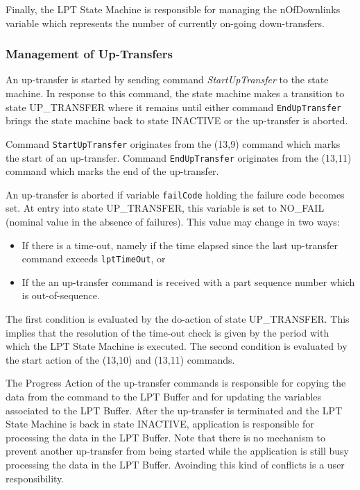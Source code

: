 \documentclass{pnp_article}
\begin{document}
Finally, the LPT State Machine is responsible for managing the nOfDownlinks variable which represents the number of currently on-going down-transfers.

\subsubsection{Management of Up-Transfers}
An up-transfer is started by sending command \textit{StartUpTransfer} to the state machine. In response to this command, the state machine makes a transition to state UP\_TRANSFER where it remains until either command \texttt{EndUpTransfer} brings the state machine back to state INACTIVE or the up-transfer is aborted. 

Command \texttt{StartUpTransfer} originates from the (13,9) command which marks the start of an up-transfer. Command \texttt{EndUpTransfer} originates from the (13,11) command which marks the end of the up-transfer.

An up-transfer is aborted if variable \texttt{failCode} holding the failure code becomes set. At entry into state UP\_TRANSFER, this variable is set to NO\_FAIL (nominal value in the absence of failures). This value may change in two ways:

\begin{itemize}
\item If there is a time-out, namely if the time elapsed since the last up-transfer command exceeds \texttt{lptTimeOut}, or
\item If the an up-transfer command is received with a part sequence number which is out-of-sequence.
\end{itemize}

The first condition is evaluated by the do-action of state UP\_TRANSFER. This implies that the resolution of the time-out check is given by the period with which the LPT State Machine is executed. The second condition is evaluated by the start action of the (13,10) and (13,11) commands.

The Progress Action of the up-transfer commands is responsible for copying the data from the command to the LPT Buffer and for updating the variables associated to the LPT Buffer. After the up-transfer is terminated and the LPT State Machine is back in state INACTIVE, application is responsible for processing the data in the LPT Buffer. Note that there is no mechanism to prevent another up-transfer from being started while the application is still busy processing the data in the LPT Buffer. Avoinding this kind of conflicts is a user responsibility.
\end{document}
